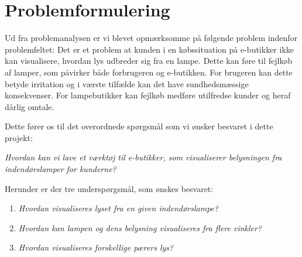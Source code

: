 \section{Problemformulering}
\label{sec:problemformulering}

Ud fra problemanalysen er vi blevet opmærksomme på følgende problem indenfor problemfeltet:
Det er et problem at kunden i en købssituation på e-butikker ikke kan visualisere, hvordan lys udbreder sig fra en lampe. Dette kan føre til fejlkøb af lamper, som påvirker både forbrugeren og e-butikken. For brugeren kan dette betyde irritation og i værste tilfælde kan det have sundhedsmæssige konsekvenser. For lampebutikker kan fejlkøb medføre utilfredse kunder og heraf dårlig omtale. 

Dette fører os til det overordnede spørgsmål som vi ønsker besvaret i dette projekt:

\textit{Hvordan kan vi lave et værktøj til e-butikker, som visualiserer belysningen fra indendørslamper for kunderne?}

Herunder er der tre underspørgsmål, som ønskes besvaret:

\begin{enumerate}

\item \textit{Hvordan visualiseres lyset fra en given indendørslampe?}
\item \textit{Hvordan kan lampen og dens belysning visualiseres fra flere vinkler?}
\item \textit{Hvordan visualiseres forskellige pærers lys?}

\end{enumerate}

\clearpage